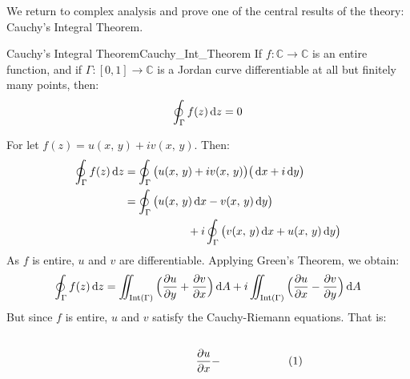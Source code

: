     We return to complex analysis and prove one of the central results of
    the theory: Cauchy's Integral Theorem.
    \newpage
    \begin{ftheorem}{Cauchy's Integral Theorem}{Cauchy_Int_Theorem}
        If $f:\mathbb{C}\rightarrow\mathbb{C}$ is an entire function, and
        if $\Gamma:[0,1]\rightarrow\mathbb{C}$ is a Jordan curve
        differentiable at all but finitely many points, then:
        \begin{equation}
            \oint_{\Gamma}f(z)\mathop{}\!\mathrm{d}{z}=0
        \end{equation}
    \end{ftheorem}
    \begin{bproof}
        For let $f(z)=u(x,\,y)+iv(x,\,y)$. Then:
        \begin{subequations}
            \begin{align}
                \oint_{\Gamma}f(z)\mathop{}\!\mathrm{d}{z}
                &=\oint_{\Gamma}\big(u(x,\,y)+iv(x,\,y)\big)
                    \big(\mathop{}\!\mathrm{d}{x}+i\mathop{}\!\mathrm{d}{y}\big)\\
                \nonumber&=\oint_{\Gamma}
                    \big(u(x,\,y)\mathop{}\!\mathrm{d}{x}-v(x,\,y)\mathop{}\!\mathrm{d}{y}\big)\\
                &\hspace{2cm}+i\oint_{\Gamma}
                    \big(v(x,\,y)\mathop{}\!\mathrm{d}{x}+u(x,\,y)\mathop{}\!\mathrm{d}{y}\big)
            \end{align}
        \end{subequations}
        As $f$ is entire, $u$ and $v$ are differentiable.
        Applying Green's Theorem, we obtain:
        \begin{equation}
            \oint_{\Gamma}f(z)\mathop{}\!\mathrm{d}{z}
            =\iint_{\operatorname{Int}(\Gamma)}
            \Big(\frac{\partial{u}}{\partial{y}}+
                 \frac{\partial{v}}{\partial{x}}\Big)
                 \mathop{}\!\mathrm{d}{A}+
            i\iint_{\operatorname{Int}(\Gamma)}
            \Big(\frac{\partial{u}}{\partial{x}}-
                 \frac{\partial{v}}{\partial{y}}\Big)\mathop{}\!\mathrm{d}{A}
        \end{equation}
        But since $f$ is entire, $u$ and $v$ satisfy
        the Cauchy-Riemann equations. That is:
        \par\hfill\par
        \begin{subequations}
            \begin{minipage}{0.49\textwidth}
                \centering
                \begin{equation}
                    \frac{\partial{u}}{\partial{x}}-

\end{equation}
\end{minipage}
\end{subequations}
\end{bproof}
